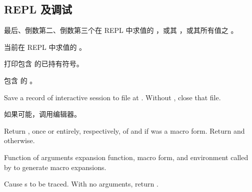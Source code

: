 \subsection{REPL 及调试} 

\begin{LIST}{1cm}
  
  {
  最后、倒数第二、倒数第三个在 REPL
  中求值的 ，或其 ，或其所有值之
  。
  }

  \IT{\V*{--}}
  {
  当前在 REPL 中求值的 。
  }

  {
  打印包含  的已持有符号。
  }

  {
  包含  的 。
  }

  {
  Save a record of interactive session to file at . Without
  , close that file.
  }

  {
  如果可能，调用编辑器。
  }

  {
  Return , once or entirely, respectively, of
   and \retvalii{\T} if  was a macro form. 
  Return  and \retvalii{\NIL} otherwise.
  }

  {
  Function of arguments expansion function, macro form, and
  environment called by  to generate macro
  expansions. 
  }

  {
  Cause s to be traced. With no arguments,
  return .
  }


\end{LIST}
